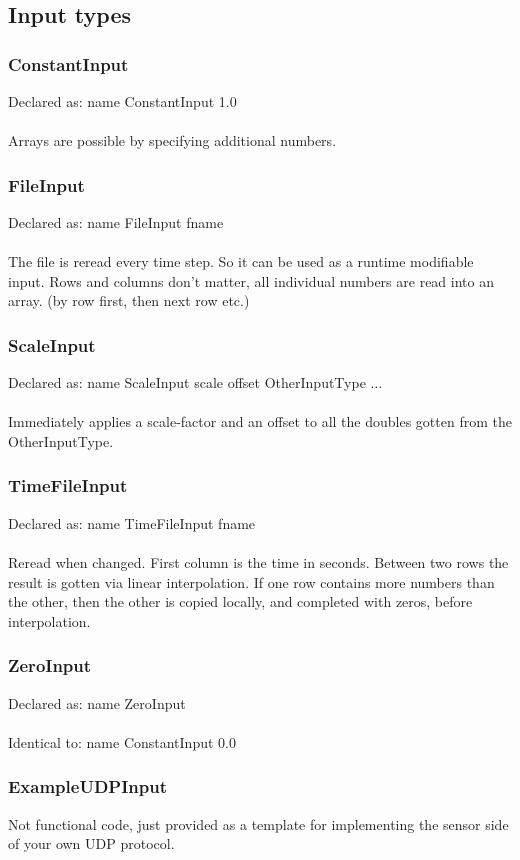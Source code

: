 \documentclass[a4paper]{article}
\begin{document}
\subsection{Input types}
\subsubsection{ConstantInput}
Declared as: name ConstantInput 1.0\\\\
Arrays are possible by specifying additional numbers.
\subsubsection{FileInput}
Declared as: name FileInput fname\\\\
The file is reread every time step. So it can be used as a runtime modifiable input.
Rows and columns don't matter, all individual numbers are read into an array. (by row first, then next row etc.)
\subsubsection{ScaleInput}
Declared as: name ScaleInput scale offset OtherInputType $\ldots$\\\\
Immediately applies a scale-factor and an offset to all the doubles gotten from the OtherInputType.
\subsubsection{TimeFileInput}
Declared as: name TimeFileInput fname\\\\
Reread when changed. First column is the time in seconds. Between two rows the result is gotten via linear interpolation. If one row contains more numbers than the other, then the other is copied locally, and completed with zeros, before interpolation.
\subsubsection{ZeroInput}
Declared as: name ZeroInput\\\\
Identical to: name ConstantInput 0.0
\subsubsection{ExampleUDPInput}
Not functional code, just provided as a template for implementing the sensor side of your own UDP protocol.
\end{document}

